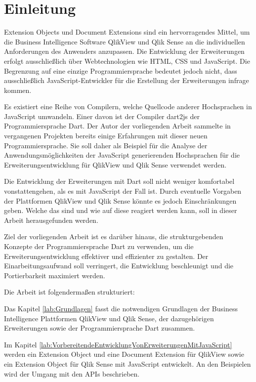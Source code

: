\section*{Einleitung}

\setcounter{page}{1}

Extension Objects und Document Extensions sind ein hervorragendes Mittel, um die Business Intelligence Software QlikView und Qlik Sense an die individuellen Anforderungen des Anwenders anzupassen. Die Entwicklung der Erweiterungen erfolgt ausschließlich über Webtechnologien wie HTML, CSS und JavaScript. Die Begrenzung auf eine einzige Programmiersprache bedeutet jedoch nicht, dass ausschließlich JavaScript-Entwickler für die Erstellung der Erweiterungen infrage kommen.

Es existiert eine Reihe von Compilern, welche Quellcode anderer Hoch\-sprachen in Java\-Script umwandeln. Einer davon ist der Compiler dart2js der Programmiersprache Dart. Der Autor der vorliegenden Arbeit sammelte in vergangenen Projekten bereits einige Erfahrungen mit dieser neuen Programmiersprache. Sie soll daher als Beispiel für die Analyse der Anwendungsmöglichkeiten der JavaScript generierenden Hochsprachen für die Erweiterungsentwicklung für QlikView und Qlik Sense verwendet werden.

Die Entwicklung der Erweiterungen mit Dart soll nicht weniger komfortabel vonstattengehen, als es mit JavaScript der Fall ist. Durch eventuelle Vorgaben der Plattformen QlikView und Qlik Sense könnte es jedoch Einschränkungen geben. Welche das sind und wie auf diese reagiert werden kann, soll in dieser Arbeit herausgefunden werden.

Ziel der vorliegenden Arbeit ist es darüber hinaus, die strukturgebenden Konzepte der Programmiersprache Dart zu verwenden, um die Erweiterungsentwicklung effektiver und effizienter zu gestalten. Der Einarbeitungsaufwand soll verringert, die Entwicklung beschleunigt und die Portierbarkeit maximiert werden.

Die Arbeit ist folgendermaßen strukturiert:

Das Kapitel \ref{lab:Grundlagen} fasst die notwendigen Grundlagen der Business Intelligence Plattformen QlikView und Qlik Sense, der dazugehörigen Erweiterungen sowie der Programmiersprache Dart zusammen.

Im Kapitel \ref{lab:VorbereitendeEntwicklungVonErweiterungenMitJavaScript} werden ein Extension Object und eine Document Extension für QlikView sowie ein Extension Object für Qlik Sense mit JavaScript entwickelt. An den Beispielen wird der Umgang mit den APIs beschrieben.

